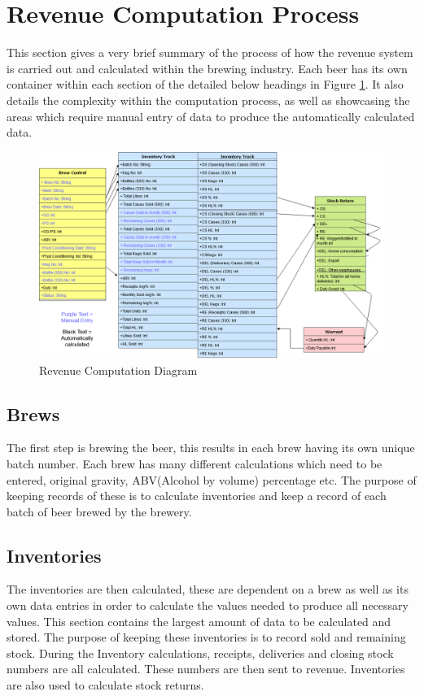 \section{Revenue Computation Process}
This section gives a very brief summary of the process of how the revenue system is carried out and calculated within the brewing industry. Each beer has its own container within each section of the detailed below headings in Figure \ref{fig:revenuecomp}. It also details the complexity within the computation process, as well as showcasing the areas which require manual entry of data to produce the automatically calculated data.
\begin{figure}[h!]
 	\caption{Revenue Computation Diagram}
	\label{fig:revenuecomp}
 	\centering
 	\includegraphics[width=1.25\textwidth]{Images/API Design.png}
\end{figure}
\newpage

\subsection{Brews}
The first step is brewing the beer, this results in each brew having its own unique batch number. Each brew has many different calculations which need to be entered, original gravity, ABV(Alcohol by volume) percentage etc. The purpose of keeping records of these is to calculate inventories and keep a record of each batch of beer brewed by the brewery.

\subsection{Inventories}
The inventories are then calculated, these are dependent on a brew as well as its own data entries in order to calculate the values needed to produce all necessary values. This section contains the largest amount of data to be calculated and stored. The purpose of keeping these inventories is to record sold and remaining stock. During the Inventory calculations, receipts, deliveries and closing stock numbers are all calculated. These numbers are then sent to revenue. Inventories are also used to calculate stock returns.

